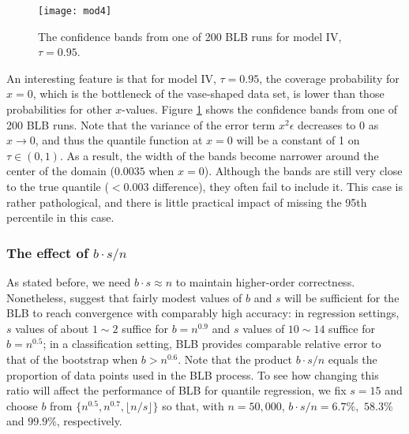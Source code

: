 \documentclass{statsoc}
\begin{document}
\begin{figure}
\begin{center}
\texttt{[image: mod4]}
\caption{The confidence bands from one of 200 BLB runs for model IV, $\tau=0.95$.}
\label{mod4}
\end{center}
\end{figure}
An interesting feature is that for model IV, $\tau=0.95$, the coverage probability for $x=0$, which is the bottleneck of the vase-shaped data set, is lower than those probabilities for other $x$-values. Figure \ref{mod4} shows the confidence bands from one of 200 BLB runs. Note that the variance of the error term $x^2\epsilon$ decreases to 0 as $x\rightarrow 0$, and thus the quantile function at $x=0$ will be a constant of 1 on $\tau\in (0,1)$. As a result, the width of the bands become narrower around the center of the domain ($0.0035$ when $x=0$). Although the bands are still very close to the true quantile ($<0.003$ difference), they often fail to include it. This case is rather pathological, and there is little practical impact of missing the 95th percentile in this case.

\subsubsection{The effect of $b \cdot s/n$}

As stated before, we need $b\cdot s\approx n$ to maintain higher-order correctness. Nonetheless, \citet{kleiner2014scalable} suggest that fairly modest values of $b$ and $s$ will be sufficient for the BLB to reach convergence with comparably high accuracy: in regression settings, $s$ values of about $1\sim 2$ suffice for $b=n^{0.9}$ and $s$ values of $10\sim 14$ suffice for $b=n^{0.5}$; in a  classification setting, BLB provides comparable relative error to that of the bootstrap when $b>n^{0.6}$. Note that the product $b \cdot s/n$ equals the proportion of data points used in the BLB process. To see how changing this ratio will affect the performance of BLB for quantile regression, we fix $s=15$ and choose $b$ from $\{n^{0.5},n^{0.7},\lfloor n/s\rfloor \}$ so that, with $n=50,000$, $b \cdot s/n=6.7\%,$  $58.3\%$ and $99.9\%$, respectively. 
\end{document}
